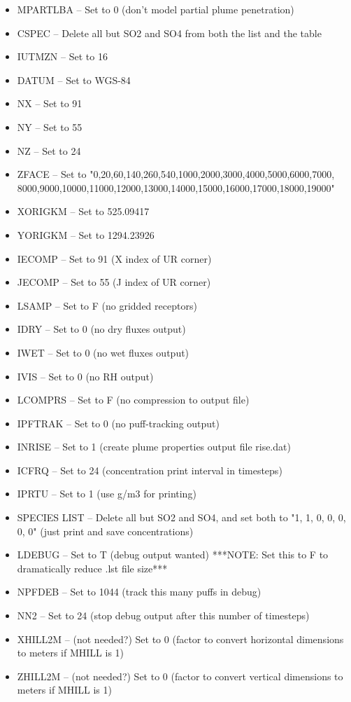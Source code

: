 \documentclass[10pt,a4paper]{article}
\begin{document}
\begin{itemize}
\begin{itemize}
\item MPARTLBA -- Set to 0 (don't model partial plume penetration)
\item CSPEC -- Delete all but SO2 and SO4 from both the list and the table
\item IUTMZN -- Set to 16
\item DATUM -- Set to WGS-84
\item NX -- Set to 91
\item NY -- Set to 55
\item NZ -- Set to 24
\item ZFACE -- Set to "0,20,60,140,260,540,1000,2000,3000,4000,5000,6000,7000, 8000,9000,10000,11000,12000,13000,14000,15000,16000,17000,18000,19000"
\item XORIGKM -- Set to 525.09417
\item YORIGKM -- Set to 1294.23926
\item IECOMP -- Set to 91 (X index of UR corner)
\item JECOMP -- Set to 55 (J index of UR corner)
\item LSAMP -- Set to F (no gridded receptors)
\item IDRY -- Set to 0 (no dry fluxes output)
\item IWET -- Set to 0 (no wet fluxes output)
\item IVIS -- Set to 0 (no RH output)
\item LCOMPRS -- Set to F (no compression to output file)
\item IPFTRAK -- Set to 0 (no puff-tracking output)
\item INRISE -- Set to 1 (create plume properties output file rise.dat)
\item ICFRQ -- Set to 24 (concentration print interval in timesteps)
\item IPRTU -- Set to 1 (use g/m3 for printing)
\item SPECIES LIST -- Delete all but SO2 and SO4, and set both to "1, 1, 0, 0, 0, 0, 0" (just print and save concentrations)
\item LDEBUG -- Set to T (debug output wanted) ***NOTE: Set this to F to dramatically reduce .lst file size***
\item NPFDEB -- Set to 1044 (track this many puffs in debug)
\item NN2 -- Set to 24 (stop debug output after this number of timesteps)
\item XHILL2M -- (not needed?) Set to 0 (factor to convert horizontal dimensions to meters if MHILL is 1)
\item ZHILL2M -- (not needed?) Set to 0 (factor to convert vertical dimensions to meters if MHILL is 1)

\end{itemize}
\end{itemize}
\end{document}
